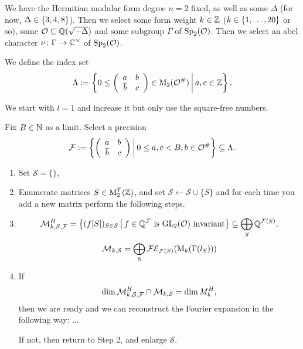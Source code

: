 \begin{algo}
We have the Hermitian modular form degree $n = 2$ fixed, as well as some $\Delta$ (for now, $\Delta \in \Set{3,4,8}$). Then we select some form weight $k \in \mathbb{Z}$ ($k \in \Set{1,\dots,20}$ or so), some $\mathcal{O} \subseteq \mathbb{Q}(\sqrt{-\Delta})$ and some subgroup $\Gamma$ of $\operatorname{Sp}_2(\mathcal{O})$. Then we select an abel character $\nu \colon \Gamma \rightarrow \mathbb{C}^\times$ of $\operatorname{Sp}_2(\mathcal{O})$.

We define the index set
\[ \Lambda := \Set{0 \le \SimpleMatrix{a}{b}{\overline b}{c} \in \M_2(\curlO^\#)}{a,c \in \Z } . \]

We start with $l = 1$ and increase it but only use the square-free numbers.

Fix $B \in \mathbb{N}$ as a limit. Select a precision
\[ \F := \Set{\SimpleMatrix{a}{b}{\overline b}{c}}{0 \le a , c < B, b \in \curlO^\#} \subseteq \Lambda . \]

\begin{enumerate}
\item Set $\mathcal{S} = \{\}$,
\item Enumerate matrices $S \in \operatorname{M}_2^T(\mathbb{Z})$, and set $\mathcal{S} \leftarrow \mathcal{S} \cup \{ S \}$ and for each time you add a new matrix perform the following steps.


\item
\[ \mathcal{M}_{k,\mathcal{S},\F}^H = \Set{ (f [S])_{S\in\mathcal{S}} }{\text{$f \in \Q^\F$ is $\GL_2(\curlO)$ invariant}} \subseteq \bigoplus_S \Q^{\F(S)} , \]
\[ \mathcal{M}_{k, \mathcal{S}} = \bigoplus_S \mathcal{FE}_{\mathcal{F}(S)}(\operatorname{M}_k(\Gamma(l_S))) \]

\item
If
\[ \dim \mathcal{M}_{k,\mathcal{S},\mathcal{F}}^H \cap \mathcal{M}_{k, \mathcal{S}}
= \dim M^H_k , \]
then we are ready and we can reconstruct the Fourier expansion in the following way: ...

If not, then return to Step 2, and enlarge $\mathcal{S}$.
\end{enumerate}
\end{algo}

